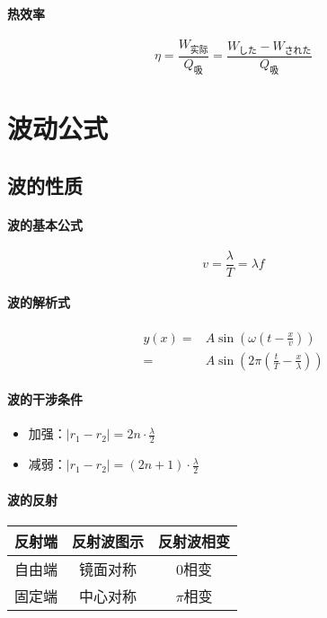 \paragraph{热效率}
\begin{equation*}
    \eta=\frac{W_\textrm{实际}}{Q_\textrm{吸}}
    =\frac{W_\textrm{した}-W_\textrm{された}}{Q_\textrm{吸}}
\end{equation*}

\section{波动公式}

\subsection{波的性质}

\paragraph{波的基本公式}
\begin{equation*}
    v=\frac{\lambda}{T}=\lambda f
\end{equation*}

\paragraph{波的解析式}
\begin{align*}
    y(x)=&A\sin\left(\omega\left(t-\frac{x}{v}\right)\right)\\
    =&A\sin\left(2\pi\left(\frac{t}{T}-\frac{x}{\lambda}\right)\right)
\end{align*}

\paragraph{波的干涉条件}
\begin{itemize}
    \item 加强：$|r_1-r_2|=2n\cdot\frac{\lambda}{2}$
    \item 减弱：$|r_1-r_2|=(2n+1)\cdot\frac{\lambda}{2}$
\end{itemize}

\paragraph{波的反射}
\begin{center}
    \renewcommand\arraystretch{1.2}
    \begin{tabular}{c|cc}
        \hline
        反射端&反射波图示&反射波相变\\\hline
        自由端&镜面对称&0相变\\
        固定端&中心对称&$\pi$相变\\\hline
    \end{tabular}
\end{center}

